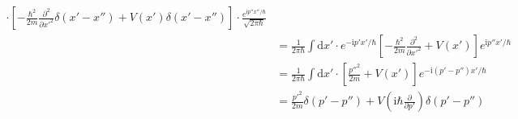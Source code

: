\documentclass[a4paper]{article}
\begin{document}
\begin{CJK*}{UTF8}{song}
{\begin{equation*}
\begin{split}
            \cdot [-\frac{\hbar^{2}}{2m}\frac{\partial^{2}}{\partial {x'}^{2}}
            \delta(x'-x'')+V(x')\delta(x'-x'')]\cdot
            \frac{e^{\mathrm{i}p''x''/\hbar}}{\sqrt{2\pi\hbar}}\\
        & = \frac{1}{2\pi\hbar}\int\mathrm{d}x'
            \cdot e^{-\mathrm{i}p'x'/\hbar}
            [-\frac{\hbar^{2}}{2m}\frac{\partial^{2}}{\partial {x'}^{2}}+V(x')]
            e^{\mathrm{i}p''x'/\hbar}\\
        & = \frac{1}{2\pi\hbar}\int\mathrm{d}x'\cdot
            [\frac{{p''}^{2}}{2m}+V(x')]e^{-\mathrm{i}(p'-p'')x'/\hbar}\\
        & = \frac{{p'}^{2}}{2m}\delta(p'-p'')+V(\mathrm{i}\hbar\frac{\partial}{\partial p'})\delta(p'-p'')
    \end{split}\end{equation*}
    }\\[20pt]
    \end{CJK*}
\end{document}
